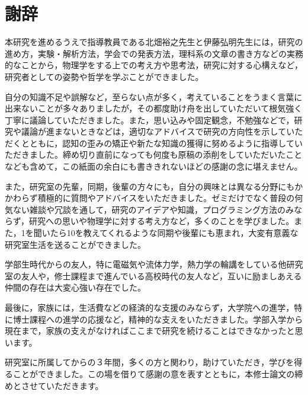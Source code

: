 \documentclass[autodetect-engine,dvi=dvipdfmx,a4paper,ja=standard,oneside,openany,11pt,draft]{bxjsbook}
\begin{document}
\chapter{謝辞}
本研究を進めるうえで指導教員である北畑裕之先生と伊藤弘明先生には，研究の進め方，実験・解析方法，学会での発表方法，理科系の文章の書き方などの実務的なことから，物理学をする上での考え方や思考法，研究に対する心構えなど，研究者としての姿勢や哲学を学ぶことができました。

自分の知識不足や誤解など，至らない点が多く，考えていることをうまく言葉に出来ないことが多々ありましたが，その都度助け舟を出していただいて根気強く丁寧に議論していただきました。また，思い込みや固定観念，不勉強などで，研究や議論が進まないときなどは，適切なアドバイスで研究の方向性を示していただくとともに，認知の歪みの矯正や新たな知識の獲得に努めるように指導していただきました。締め切り直前になっても何度も原稿の添削をしていただいたことなども含めて，この紙面の余白にも書ききれないほどの感謝の念に堪えません。

また，研究室の先輩，同期，後輩の方々にも，自分の興味とは異なる分野にもかかわらず積極的に質問やアドバイスをいただきました。ゼミだけでなく普段の何気ない雑談や冗談を通して，研究のアイデアや知識，プログラミング方法のみならず，研究への思いや物理学に対する考え方など，多くのことを学びました。また，1を聞いたら10を教えてくれるような同期や後輩にも恵まれ，大変有意義な研究室生活を送ることができました。

学部生時代からの友人，特に電磁気や流体力学，熱力学の輪講をしている他研究室の友人や，修士課程まで進んでいる高校時代の友人など，互いに励ましあえる仲間の存在は大変心強い存在でした。

最後に，家族には，生活費などの経済的な支援のみならず，大学院への進学，特に博士課程への進学の応援など，精神的な支えをいただきました。学部入学から現在まで，家族の支えがなければここまで研究を続けることはできなかったと思います。

研究室に所属してからの３年間，多くの方と関わり，助けていただき，学びを得ることができました。この場を借りて感謝の意を表すとともに，本修士論文の締めとさせていただきます。


\ifdraft{
  
  
}{}
\end{document}
